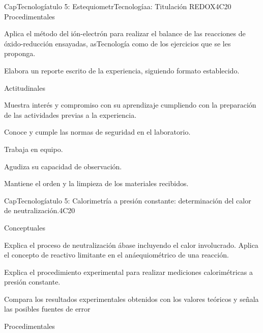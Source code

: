 \begin{syllabus}
\begin{unit}{CapTecnologíatulo 5:  EstequiometrTecnologíaa: Titulación REDOX}{}{}{4}{C20}
   Procedimentales

\begin{topics}
      \item Aplica el método del ión-electrón para realizar el balance de las reacciones de óxido-reducción ensayadas, asTecnología como de los ejercicios que se les proponga.
      \item Elabora un reporte escrito de la experiencia, siguiendo formato establecido.
   \end{topics}
   
   Actitudinales

\begin{topics}
      \item Muestra interés y compromiso con su aprendizaje cumpliendo con la preparación de las actividades previas a la experiencia.
      \item Conoce y cumple las normas de seguridad en el laboratorio.
      \item Trabaja en equipo.
      \item Agudiza su capacidad de observación.
     \item Mantiene el orden y la limpieza de los materiales recibidos.
   \end{topics}

   \begin{learningoutcomes}
      \item 
   \end{learningoutcomes}
   
\end{unit}

\begin{unit}{CapTecnologíatulo 5:  Calorimetría a presión constante: determinación del calor de neutralización.}{}{}{4}{C20}

Conceptuales

\begin{topics}
      \item  Explica el proceso de neutralización ábase incluyendo el calor involucrado.
   Aplica el concepto de reactivo limitante en el anáequiométrico de una reacción.
	\item Explica el procedimiento experimental para realizar mediciones calorimétricas a presión constante.
	\item Compara los resultados experimentales obtenidos con los valores teóricos y señala las posibles fuentes de error 
   \end{topics}
   
   Procedimentales


\end{unit}
\end{syllabus}

